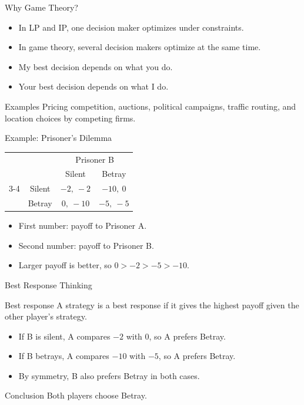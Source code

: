 \documentclass[10pt,aspectratio=169]{beamer}
\newcommand{\pay}[2]{#1,\ #2}
\begin{document}
\begin{frame}{Why Game Theory?}
\begin{itemize}
  \item In LP and IP, one decision maker optimizes under constraints.
  \item In game theory, several decision makers optimize at the same time.
  \item My best decision depends on what you do.
  \item Your best decision depends on what I do.
\end{itemize}
\vspace{0.3cm}
\begin{block}{Examples}
Pricing competition, auctions, political campaigns, traffic routing, and location choices by competing firms.
\end{block}
\end{frame}

\begin{frame}{Example: Prisoner's Dilemma}
\begin{center}
\begin{tabular}{c c c c}
 & & \multicolumn{2}{c}{Prisoner B}\\
 & & Silent & Betray\\
\cmidrule{3-4}
\multirow{2}{*}{Prisoner A} & Silent & $\pay{-2}{-2}$ & $\pay{-10}{0}$\\
 & Betray & $\pay{0}{-10}$ & $\pay{-5}{-5}$\\
\end{tabular}
\end{center}
\vspace{0.3cm}
\begin{itemize}
  \item First number: payoff to Prisoner A.
  \item Second number: payoff to Prisoner B.
  \item Larger payoff is better, so $0>-2>-5>-10$.
\end{itemize}
\end{frame}

\begin{frame}{Best Response Thinking}
\begin{block}{Best response}
A strategy is a best response if it gives the highest payoff given the other player's strategy.
\end{block}
\vspace{0.2cm}
\begin{itemize}
  \item If B is silent, A compares $-2$ with $0$, so A prefers Betray.
  \item If B betrays, A compares $-10$ with $-5$, so A prefers Betray.
  \item By symmetry, B also prefers Betray in both cases.
\end{itemize}
\vspace{0.2cm}
\begin{block}{Conclusion}
Both players choose Betray.
\end{block}
\end{frame}
\end{document}
